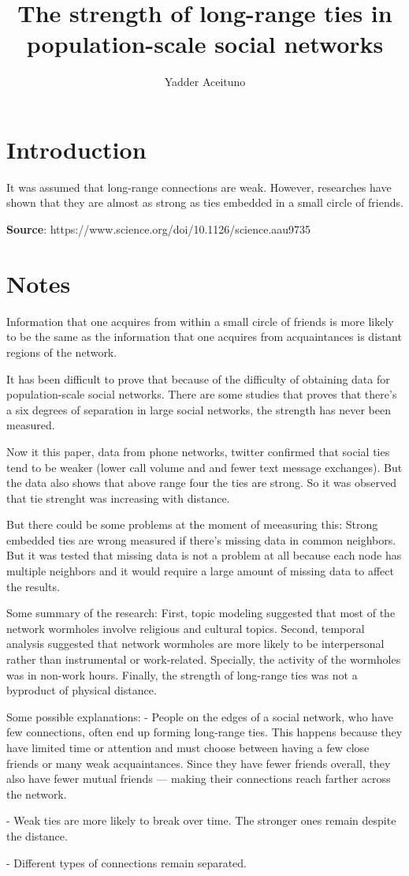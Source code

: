 \documentclass{article}
\title{The strength of long-range ties in population-scale social networks}
\author{Yadder Aceituno}
\begin{document}
\maketitle


\section{Introduction}

It was assumed that long-range connections are weak. However, researches have shown 
that they are almost as strong as ties embedded in a small circle of friends.

\textbf{Source}: https://www.science.org/doi/10.1126/science.aau9735

\section{Notes}

Information that one acquires from within a small circle of friends is more likely to be the same 
as the information that one acquires from acquaintances is distant regions of the network.

It has been difficult to prove that  because of the difficulty of obtaining data for population-scale social networks.
There are some studies that proves that there's a six degrees of separation in large social networks,
the strength has never been measured.

Now it this paper, data from phone networks, twitter confirmed that social ties tend to be weaker 
(lower call volume and and fewer text message exchanges). But the data also shows that above 
range four the ties are strong. So it was observed that tie strenght was increasing with distance.

But there could be some problems at the moment of meeasuring this: Strong embedded ties are wrong measured 
if there's missing data in common neighbors. But it was tested that missing data is not a problem at all because
each node has multiple neighbors and it would require a large amount of missing data to affect the results.

Some summary of the research:
First, topic modeling suggested that most of the network wormholes involve religious and cultural topics.
Second, temporal analysis suggested that network wormholes are more likely to be interpersonal rather
than instrumental or work-related. Specially, the activity of the wormholes was in non-work hours.
Finally, the strength of long-range ties was not a byproduct of physical distance.

Some possible explanations: 
- People on the edges of a social network, who have few connections, often end up forming long-range ties. 
This happens because they have limited time or attention and must choose between having a few close friends 
or many weak acquaintances. Since they have fewer friends overall, they also have fewer mutual friends — making 
their connections reach farther across the network.

- Weak ties are more likely to break over time. The stronger ones remain despite the distance.

- Different types of connections remain separated. 
\end{document}
